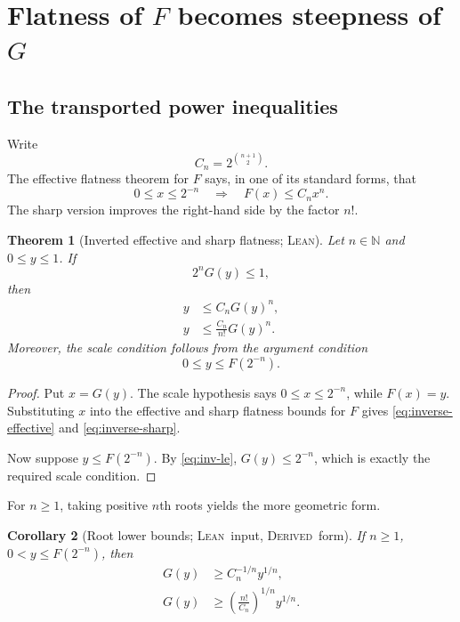 \documentclass[11pt,oneside]{article}
\newtheorem{theorem}{Theorem}[section]
\newtheorem{corollary}[theorem]{Corollary}
\theoremstyle{definition}
\theoremstyle{remark}
\newcommand{\N}{\mathbb N}
\newcommand{\InvF}{G}
\newcommand{\Formalized}{\textsc{Lean}}
\newcommand{\Derived}{\textsc{Derived}}
\begin{document}
\section{\texorpdfstring{Flatness of \(F\) becomes steepness of \(\InvF\)}{Flatness of F becomes steepness of its inverse}}
\label{sec:inverse-steepness}

\subsection{The transported power inequalities}

Write
\[
 C_n=2^{\binom{n+1}{2}}.
\]
The effective flatness theorem for $F$ says, in one of its standard forms,
that
\[
 0\leq x\leq2^{-n}
 \quad\Longrightarrow\quad
 F(x)\leq C_nx^n. \label{eq:flatness-input}
\]
The sharp version improves the right-hand side by the factor $n!$.

\begin{theorem}[Inverted effective and sharp flatness; \Formalized]
\label{thm:inverted-flatness}
Let $n\in\N$ and $0\leq y\leq1$.  If
\[
 2^n\InvF(y)\leq1,
\]
then
\begin{align}
 y&\leq C_n\InvF(y)^n, \label{eq:inverse-effective}\\
 y&\leq \frac{C_n}{n!}\InvF(y)^n. \label{eq:inverse-sharp}
\end{align}
Moreover, the scale condition follows from the argument condition
\[
 0\leq y\leq F(2^{-n}).
\]
\end{theorem}

\begin{proof}
Put $x=\InvF(y)$.  The scale hypothesis says $0\leq x\leq2^{-n}$, while
$F(x)=y$.  Substituting $x$ into the effective and sharp flatness bounds
for $F$ gives \eqref{eq:inverse-effective} and
\eqref{eq:inverse-sharp}.

Now suppose $y\leq F(2^{-n})$.  By
\eqref{eq:inv-le}, $\InvF(y)\leq2^{-n}$, which is exactly the required
scale condition.
\end{proof}

For $n\geq1$, taking positive $n$th roots yields the more geometric form.

\begin{corollary}[Root lower bounds; \Formalized\ input, \Derived\ form]
\label{cor:root-lower}
If $n\geq1$, $0<y\leq F(2^{-n})$, then
\begin{align}
 \InvF(y)&\geq C_n^{-1/n}y^{1/n}, \label{eq:root-effective}\\
 \InvF(y)&\geq
 \left(\frac{n!}{C_n}\right)^{1/n}y^{1/n}. \label{eq:root-sharp}
\end{align}
\end{corollary}
\end{document}
